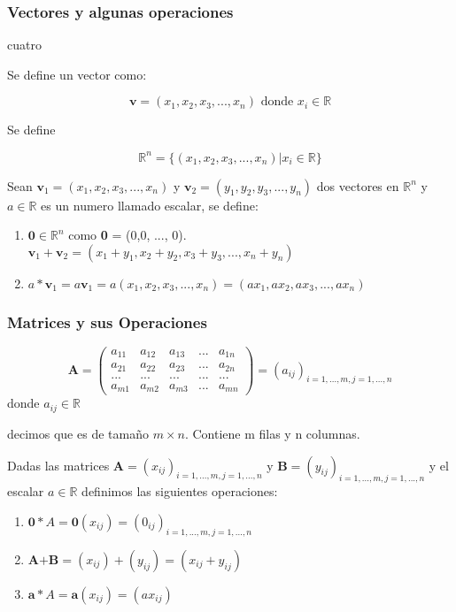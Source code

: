 \begin{frame}\frametitle{Vectores y algunas operaciones} cuatro

Se define un vector como:

$$
\textbf{v} = (x_1, x_2, x_3, ..., x_n) \text{ donde } x_i \in \mathbb{R}
$$

Se define

$$
\mathbb{R}^n = \{(x_1, x_2, x_3, ..., x_n) | x_i \in \mathbb{R} \}
$$ 

\end{frame}

\begin{frame} %

Sean $\textbf{v}_1 = (x_1, x_2, x_3, ..., x_n)$ y $\textbf{v}_2 = (y_1, y_2, y_3, ..., y_n)$  
dos vectores en $\mathbb{R}^n$ y $a \in \mathbb{R}$ es un numero llamado escalar, se define:

\begin{enumerate}
\item $\textbf{0} \in \mathbb{R}^n$ como \textbf{0} = (0,0, ..., 0).
\iten $\textbf{v}_1 + \textbf{v}_2 = (x_1+y_1, x_2+y_2, x_3+y_3, ..., x_n+y_n)$
\item $a * \textbf{v}_1 = a \textbf{v}_1 = a(x_1, x_2, x_3, ..., x_n) = (ax_1, ax_2, ax_3, ..., ax_n)$
\end{enumerate}

\end{frame}

\begin{frame}\frametitle{Matrices y sus Operaciones} %

$$
\textbf{A} = \begin{pmatrix}
a_{11} & a_{12} & a_{13} & ...  & a_{1n} \\
a_{21} & a_{22} & a_{23} & ...  & a_{2n} \\
... & ... & ... & ... & ... \\
a_{m1} & a_{m2} & a_{m3} & ...  & a_{mn} 
\end{pmatrix} = (a_{ij})_{i=1,...,m, j=1,...,n}
$$ donde $a_{ij} \in \mathbb{R}$

decimos que es de tamaño $m \times n$. Contiene m filas y n columnas.

\end{frame}

\begin{frame} %

Dadas las matrices  $\textbf{A} = (x_{ij})_{i=1,...,m, j=1,...,n}$ y  $\textbf{B} = (y_{ij})_{i=1,...,m, j=1,...,n}$ y el escalar $a \in \mathbb{R}$ definimos las
siguientes operaciones:

\begin{enumerate}
\item $\textbf{0}*A = \textbf{0} (x_{ij}) = (0_{ij})_{i=1,...,m, j=1,...,n}$
\item $\textbf{A+B} = (x_{ij}) + (y_{ij}) = (x_{ij} + y_{ij})$
\item $\textbf{a}*A = \textbf{a} (x_{ij}) = (ax_{ij})$
\end{enumerate}

\end{frame}

\begin{frame} %


\end{frame}

